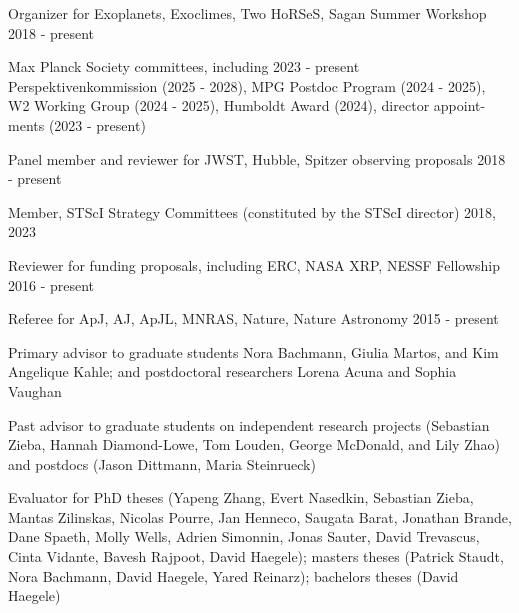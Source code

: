 \documentclass[12pt,letterpaper]{article}
\begin{document}
\begin{list}{}{\cvlist}
    \item Organizer for Exoplanets, Exoclimes, Two HoRSeS, Sagan Summer Workshop \hfill 2018 - present
    \item Max Planck Society committees, including \hfill 2023 - present\\
        \hspace*{0.5em}Perspektivenkommission (2025 - 2028), MPG Postdoc Program (2024 - 2025),\\
        \hspace*{0.5em}W2 Working Group (2024 - 2025), Humboldt Award (2024), director appoint-\\
        \hspace*{0.5em}ments (2023 - present)
    \item Panel member and reviewer for JWST, Hubble, Spitzer observing proposals \hfill 2018 - present
    \item Member, STScI Strategy Committees (constituted by the STScI director) \hfill 2018, 2023 
    \item Reviewer for funding proposals, including ERC, NASA XRP, NESSF Fellowship \hfill 2016 - present
    \item Referee for ApJ, AJ, ApJL, MNRAS, Nature, Nature Astronomy \hfill 2015 - present
\end{list}

\begin{list}{}{\cvlist}
\item Primary advisor to graduate students Nora Bachmann, Giulia Martos, and Kim Angelique Kahle; and postdoctoral researchers Lorena Acuna and Sophia Vaughan 
\item Past advisor to graduate students on independent research projects (Sebastian Zieba, Hannah Diamond-Lowe, Tom Louden, George McDonald, and Lily Zhao) and postdocs (Jason Dittmann, Maria Steinrueck)
\item Evaluator for PhD theses (Yapeng Zhang, Evert Nasedkin, Sebastian Zieba, Mantas Zilinskas, Nicolas Pourre, Jan Henneco, Saugata Barat, Jonathan Brande, Dane Spaeth, Molly Wells, Adrien Simonnin, Jonas Sauter, David Trevascus, Cinta Vidante, Bavesh Rajpoot, David Haegele); masters theses (Patrick Staudt, Nora Bachmann, David Haegele, Yared Reinarz); bachelors theses (David Haegele)

\end{list}
\end{document}
